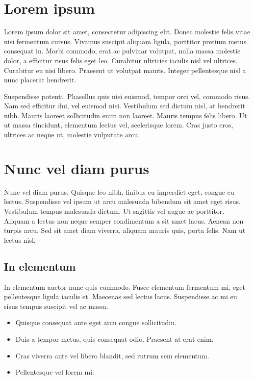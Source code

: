\documentclass{ClassTeX}
\begin{document}
	\maketitle
	\section{Lorem ipsum}
	 Lorem ipsum dolor sit amet, consectetur adipiscing elit. Donec molestie felis vitae nisi fermentum cursus. Vivamus suscipit aliquam ligula, porttitor pretium metus consequat in. Morbi commodo, erat ac pulvinar volutpat, nulla massa molestie dolor, a efficitur risus felis eget leo. Curabitur ultricies iaculis nisl vel ultrices. Curabitur eu nisi libero. Praesent ut volutpat mauris. Integer pellentesque nisl a nunc placerat hendrerit.
	 
	 Suspendisse potenti. Phasellus quis nisi euismod, tempor orci vel, commodo risus. Nam sed efficitur dui, vel euismod nisi.
	 Vestibulum sed dictum nisl, at hendrerit nibh. Mauris laoreet sollicitudin enim non laoreet. Mauris tempus felis libero. Ut ut massa tincidunt, elementum lectus vel, scelerisque lorem. Cras justo eros, ultrices ac neque ut, molestie vulputate arcu.
	 
	 \section{Nunc vel diam purus}
	 Nunc vel diam purus. Quisque leo nibh, finibus eu imperdiet eget, congue eu lectus. Suspendisse vel ipsum ut arcu malesuada bibendum sit amet eget risus. Vestibulum tempus malesuada dictum. Ut sagittis vel augue ac porttitor. Aliquam a lectus non neque semper condimentum a sit amet lacus. Aenean non turpis arcu. Sed sit amet diam viverra, aliquam mauris quis, porta felis. Nam ut lectus nisl.
	 \subsection{In elementum}
	 In elementum auctor nunc quis commodo. Fusce elementum fermentum mi, eget pellentesque ligula iaculis et. Maecenas sed lectus lacus. Suspendisse ac mi eu risus tempus suscipit vel ac massa. 
	 \begin{itemize}
	 	\item Quisque consequat ante eget arcu congue sollicitudin. 
	 	\item Duis a tempor metus, quis consequat odio. Praesent at erat enim. 
	 	\item Cras viverra ante vel libero blandit, sed rutrum sem elementum. 
	 	\item Pellentesque vel lorem mi. 
	 \end{itemize} 
	 
\end{document}
